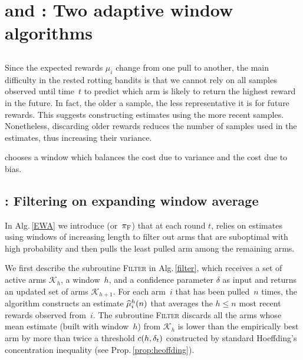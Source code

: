 
\section{{\FEWA} and {\RAW} : Two adaptive window algorithms}

\subsection{}
Since the expected rewards $\mu_i$ change from one pull to another, the main difficulty in the rested rotting bandits is that we cannot rely on all samples observed until time~$t$ to predict which arm is likely to return the highest reward in the future. In fact, the older a sample, the less representative it is for future rewards. This suggests constructing estimates using the more recent samples. Nonetheless, discarding older rewards reduces the number of samples used in the estimates, thus increasing their variance. 

\SWA chooses a window which balances the cost due to variance and the cost due to bias. %



\subsection{{\FEWA}: Filtering on expanding window average}%

 In Alg.\,\ref{EWA} we introduce \myAlgorithm (or~$\pi_{\rm F}$) that at each round $t$, relies on estimates using windows of increasing length to filter out arms that are suboptimal with high probability and then pulls the least pulled arm among the remaining arms. 

We first describe the subroutine {\small\textsc{Filter}} in Alg.\,\ref{filter}, which receives a set of active arms $\mathcal{K}_h$, a window~$h$, and a confidence parameter $\delta$ as input and returns an updated set of arms $\mathcal{K}_{h+1}$. For each arm~$i$ that has been pulled~$n$ times, the algorithm constructs an estimate $\widehat{\mu}^h_i(n)$ that averages the $h \leq n$ most recent rewards observed from~$i$. %
The subroutine {\small\textsc{Filter}} discards all the arms whose mean estimate (built with window~$h$) from $\mathcal{K}_h$  is lower than the empirically best arm by more than twice a threshold $c(h, \delta_t)$ constructed by standard Hoeffding's concentration inequality (see Prop.\,\ref{prop:heoffding}). %


